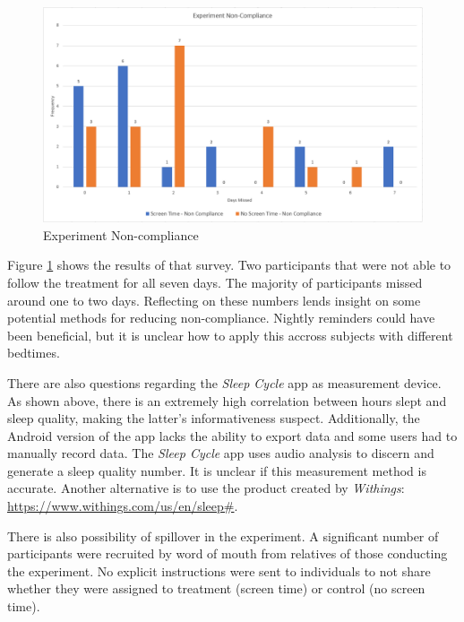 \documentclass[12pt,]{article}
\begin{document}
\begin{figure}[H]

{\centering \includegraphics[width=1\linewidth]{img/compliance} 

}

\caption{Experiment Non-compliance}\label{fig:noncompliance}
\end{figure}

Figure \ref{fig:noncompliance} shows the results of that survey. Two
participants that were not able to follow the treatment for all seven
days. The majority of participants missed around one to two days.
Reflecting on these numbers lends insight on some potential methods for
reducing non-compliance. Nightly reminders could have been beneficial,
but it is unclear how to apply this accross subjects with different
bedtimes.

There are also questions regarding the \emph{Sleep Cycle} app as
measurement device. As shown above, there is an extremely high
correlation between hours slept and sleep quality, making the latter's
informativeness suspect. Additionally, the Android version of the app
lacks the ability to export data and some users had to manually record
data. The \emph{Sleep Cycle} app uses audio analysis to discern and
generate a sleep quality number. It is unclear if this measurement
method is accurate. Another alternative is to use the product created by
\emph{Withings}: \url{https://www.withings.com/us/en/sleep\#}.

There is also possibility of spillover in the experiment. A significant
number of participants were recruited by word of mouth from relatives of
those conducting the experiment. No explicit instructions were sent to
individuals to not share whether they were assigned to treatment (screen
time) or control (no screen time).
\end{document}
